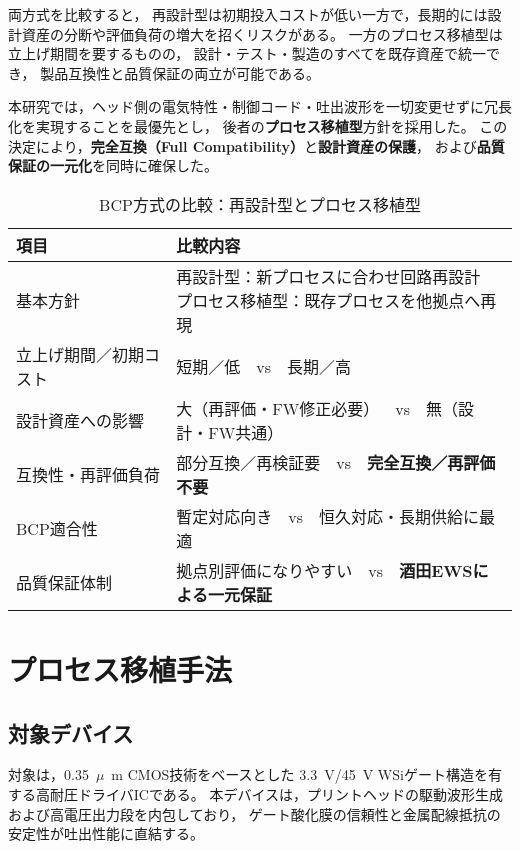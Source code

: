 \documentclass[conference]{IEEEtran}
\newcommand{\micro}{\ensuremath{\mu}}
\begin{document}
両方式を比較すると，
再設計型は初期投入コストが低い一方で，長期的には設計資産の分断や評価負荷の増大を招くリスクがある。
一方のプロセス移植型は立上げ期間を要するものの，
設計・テスト・製造のすべてを既存資産で統一でき，
製品互換性と品質保証の両立が可能である。

本研究では，ヘッド側の電気特性・制御コード・吐出波形を一切変更せずに冗長化を実現することを最優先とし，
後者の\textbf{プロセス移植型}方針を採用した。
この決定により，\textbf{完全互換（Full Compatibility）}と\textbf{設計資産の保護}，
および\textbf{品質保証の一元化}を同時に確保した。

\begin{table}[t]
\centering
\caption{BCP方式の比較：再設計型とプロセス移植型}
\label{tab:approach_compare}
\begin{tabular*}{\linewidth}{@{\extracolsep{\fill}} ll}
\toprule
\textbf{項目} & \textbf{比較内容} \\
\midrule
基本方針 &
\makecell[l]{再設計型：新プロセスに合わせ回路再設計\\
プロセス移植型：既存プロセスを他拠点へ再現} \\

立上げ期間／初期コスト &
短期／低 vs 長期／高 \\

設計資産への影響 &
大（再評価・FW修正必要） vs 無（設計・FW共通） \\

互換性・再評価負荷 &
部分互換／再検証要 vs \textbf{完全互換／再評価不要} \\

BCP適合性 &
暫定対応向き vs 恒久対応・長期供給に最適 \\

品質保証体制 &
拠点別評価になりやすい vs \textbf{酒田EWSによる一元保証} \\
\bottomrule
\end{tabular*}
\end{table}

\section{プロセス移植手法}

\subsection{対象デバイス}
対象は，\SI{0.35}{\micro\meter} CMOS技術をベースとした
\SI{3.3}{\volt}/\SI{45}{\volt} WSiゲート構造を有する高耐圧ドライバICである。
本デバイスは，プリントヘッドの駆動波形生成および高電圧出力段を内包しており，
ゲート酸化膜の信頼性と金属配線抵抗の安定性が吐出性能に直結する。
\end{document}
